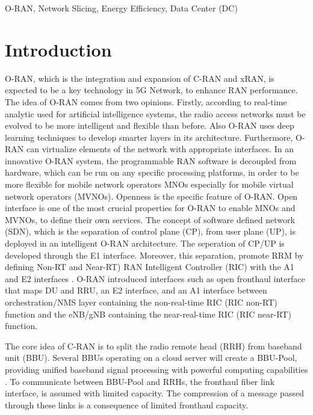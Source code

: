 \documentclass[conference]{IEEEtran}
\begin{document}
\begin{IEEEkeywords}
O-RAN, Network Slicing, Energy Efficiency, Data Center (DC)
\end{IEEEkeywords}

\section{Introduction}
O-RAN, which is the integration and expansion of C-RAN and xRAN, is expected to be a key technology in 5G Network, to enhance RAN performance.  
The idea of O-RAN comes from two opinions. Firstly, according to real-time analytic used for artificial intelligence systems, the radio access networks must be evolved to be more intelligent and flexible than before. Also O-RAN uses deep learning techniques to develop smarter layers in its architecture.
 Furthermore, O-RAN can virtualize elements of the network with  appropriate interfaces.
In an innovative O-RAN system, the programmable RAN software is decoupled from hardware, which can be run on any specific processing platforms, in order to be more flexible for mobile network operators MNOs especially for mobile virtual network operators (MVNOs)\cite{oran1}. 
Openness is the specific feature of O-RAN. Open interface is one of the most crucial properties for O-RAN to enable MNOs and MVNOs, to define their own services.
The concept of software defined network (SDN), which is the separation of control plane (CP), from user plane (UP), is deployed in an intelligent O-RAN architecture. The seperation of CP/UP is developed  through the E1 interface. Moreover, this separation, promote RRM by defining Non-RT
and Near-RT) RAN Intelligent Controller (RIC) with the A1 and E2 interfaces .
O-RAN introduced interfaces such as open fronthaul interface that maps DU and RRU, an E2 interface, and an A1 interface between orchestration/NMS layer containing the non-real-time RIC
(RIC non-RT) function and the eNB/gNB containing the near-real-time RIC
(RIC near-RT) function.\cite{oranpaper}

The core idea of C-RAN is to split the radio remote head (RRH) from baseband unit (BBU). Several BBUs operating on a cloud server will create a BBU-Pool, providing unified baseband signal processing with powerful computing capabilities \cite{cran1}.
To communicate between BBU-Pool and RRHs, the fronthaul fiber link interface, is assumed with limited capacity. The compression of a message passed through these links is a consequence of limited fronthaul capacity\cite{frdl,simeone2016cloud,motalleb2017optimal}.
\end{document}
